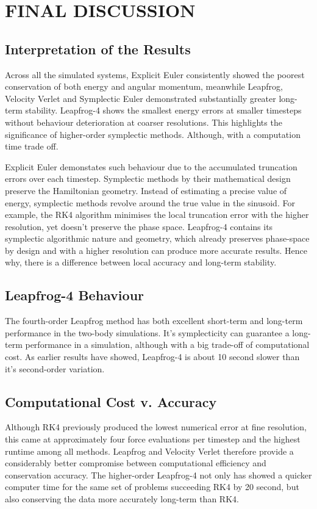 \section{FINAL DISCUSSION}

\subsection{Interpretation of the Results}

Across all the simulated systems, Explicit Euler consistently showed the poorest conservation of both energy and
angular momentum, meanwhile Leapfrog, Velocity Verlet and Symplectic Euler demonstrated substantially greater
long-term stability.
Leapfrog-4 shows the smallest energy errors at smaller timesteps without behaviour deterioration at coarser resolutions.
This highlights the significance of higher-order symplectic methods. Although, with a computation time trade off.

Explicit Euler demonstates such behaviour due to the accumulated truncation errors over each timestep.
Symplectic methods by their mathematical design preserve the Hamiltonian geometry.
Instead of estimating a precise value of energy, symplectic methods revolve around the true value in the sinusoid.
For example, the RK4 algorithm minimises the local truncation error with the higher resolution, yet doesn't preserve
the phase space.
Leapfrog-4 contains its symplectic algorithmic nature and geometry, which already preserves phase-space by design
and with a higher resolution can produce more accurate results.
Hence why, there is a difference between local accuracy and long-term stability.

\subsection{Leapfrog-4 Behaviour}

The fourth-order Leapfrog method has both excellent short-term and long-term performance in the two-body simulations.
It's symplecticity can guarantee a long-term performance in a simulation, although with a big trade-off of computational cost.
As earlier results have showed, Leapfrog-4 is about 10 second slower than it's second-order variation.

\subsection{Computational Cost v. Accuracy}

Although RK4 previously produced the lowest numerical error at fine resolution, this came at approximately four force evaluations
per timestep and the highest runtime among all methods.
Leapfrog and Velocity Verlet therefore provide a considerably better compromise between computational efficiency and
conservation accuracy.
The higher-order Leapfrog-4 not only has showed a quicker computer time for the same set of problems succeeding RK4 by 20 second,
but also conserving the data more accurately long-term than RK4.

